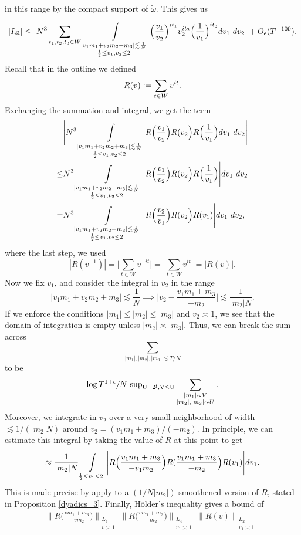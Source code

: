 in this range by the compact support of $\tilde{\omega}$. This gives us \begin{equation}
    |I_{\vec{m}}|\leq \Bigg|N^3 \sum_{t_1,t_2,t_3\in W}\int\displaylimits_{\substack{
        |v_1m_1+v_2m_2+m_3|\lesssim \frac{1}{N}\\
        \frac{1}{2}\leq v_1,v_2\leq 2
    }} \Big(\frac{v_1}{v_2}\Big)^{it_1} v_2^{it_2}\Big(\frac{1}{v_1}\Big)^{it_3}  dv_1\ dv_2 \Bigg|+O_{\epsilon}(T^{-100}).
\end{equation}
Recall that in the outline we defined\[
R(v)\mathrel{\mathop:}=\sum_{t\in W} v^{it}.
\]
Exchanging the summation and integral, we get the term \begin{align*}
    &\Bigg| N^3 \int\displaylimits_{\substack{
        |v_1m_1+v_2m_2+m_3|\lesssim \frac{1}{N}\\
        \frac{1}{2}\leq v_1,v_2\leq 2
    }} R\Big(\frac{v_1}{v_2}\Big) R({v_2}\Big) R\Big(\frac{1}{v_1}\Big) dv_1\ dv_2 \Bigg|\\
    \leq & N^3 \int\displaylimits_{\substack{
        |v_1m_1+v_2m_2+m_3|\lesssim \frac{1}{N}\\
        \frac{1}{2}\leq v_1,v_2\leq 2
    }} \Bigg|R\Big(\frac{v_1}{v_2}\Big) R({v_2}\Big) R\Big(\frac{1}{v_1}\Big)\Bigg| dv_1\ dv_2 \\
    =  & N^3 \int\displaylimits_{\substack{
        |v_1m_1+v_2m_2+m_3|\lesssim \frac{1}{N}\\
        \frac{1}{2}\leq v_1,v_2\leq 2
    }} \Bigg|R\Big(\frac{v_2}{v_1}\Big) R({v_2}\Big) R({v_1})\Bigg| dv_1\ dv_2,
\end{align*}
where the last step, we used \[
|R(v^{-1})| = \Big|\sum_{t\in W} v^{-it}\Big| = \Big|\sum_{t\in W} v^{it}\Big| = |R(v)|.
\]
Now we fix $v_1$, and consider the integral in $v_2$ in the range \[
    |v_1m_1+v_2m_2+m_3|\lesssim \frac{1}{N} \implies \Big|v_2 -\frac{v_1m_1+m_3}{-m_2}\Big|\lesssim \frac{1}{|m_2| N}.
\]
If we enforce the conditions $|m_1|\leq |m_2|\leq|m_3|$ and $v_2\asymp 1$, we see that the domain of integration is empty unless $|m_2|\asymp |m_3|$. Thus, we can break the sum across \[\sum_{|m_1|,|m_2|,|m_3|\lesssim T/N}\] to be \[\log T^{1+\epsilon}/N \ \rm{sup}_{U=2^j, V\leq U} \sum_{\substack{|m_1|\sim V\\  |m_2|, |m_3|\sim U}}.\]
Moreover, we integrate in $v_2$ over a very small neighborhood of width $\lesssim 1/(|m_2|N)$ around $v_2=({v_1m_1+m_3})/({-m_2})$. In principle, we can estimate this integral by taking the value of $R$ at this point to get \[
    \approx  \frac{1}{|m_2|N} \int\displaylimits_{\substack{
        \frac{1}{2}\leq v_1\leq 2
    }} \Bigg|R\Big(\frac{v_1m_1+m_3}{-v_1m_2}\Big) R(\frac{v_1m_1+m_3}{-m_2}\Big) R({v_1})\Bigg| dv_1.
\]
This is made precise by apply to a $(1/N|m_2|)$-smoothened version of $R$, stated in Proposition \ref{dyadics_3}. Finally, H\"older's inequality gives a bound of \begin{align*}
    \Big\|R\Big(\frac{vm_1+m_3}{-vm_2}\Big) \Big\|_{\substack{L_4\\ v\asymp 1}}\Big\|R\Big(\frac{vm_1+m_3}{-m_2}\Big) \Big\|_{\substack{L_4\\ v_1\asymp 1}}\Big\|R(v) \Big\|_{\substack{L_2\\ v_1\asymp 1}}
\end{align*}

